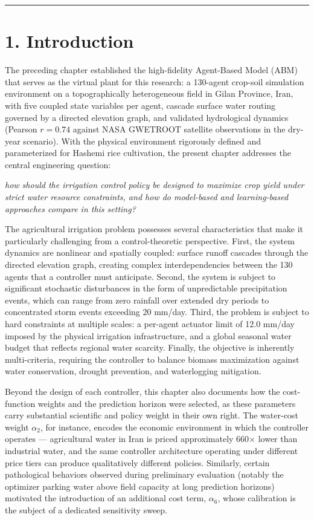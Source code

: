 \begin{center}\rule{0.5\linewidth}{0.5pt}\end{center}

\section{1. Introduction}\label{introduction}

The preceding chapter established the high-fidelity Agent-Based Model
(ABM) that serves as the virtual plant for this research: a 130-agent
crop-soil simulation environment on a topographically heterogeneous
field in Gilan Province, Iran, with five coupled state variables per
agent, cascade surface water routing governed by a directed elevation
graph, and validated hydrological dynamics (Pearson \(r = 0.74\) against
NASA GWETROOT satellite observations in the dry-year scenario). With the
physical environment rigorously defined and parameterized for Hashemi
rice cultivation, the present chapter addresses the central engineering
question:

\emph{how should the irrigation control policy be designed to maximize
crop yield under strict water resource constraints, and how do
model-based and learning-based approaches compare in this setting?}

The agricultural irrigation problem possesses several characteristics
that make it particularly challenging from a control-theoretic
perspective. First, the system dynamics are nonlinear and spatially
coupled: surface runoff cascades through the directed elevation graph,
creating complex interdependencies between the 130 agents that a
controller must anticipate. Second, the system is subject to significant
stochastic disturbances in the form of unpredictable precipitation
events, which can range from zero rainfall over extended dry periods to
concentrated storm events exceeding 20 mm/day. Third, the problem is
subject to hard constraints at multiple scales: a per-agent actuator
limit of 12.0 mm/day imposed by the physical irrigation infrastructure,
and a global seasonal water budget that reflects regional water
scarcity. Finally, the objective is inherently multi-criteria, requiring
the controller to balance biomass maximization against water
conservation, drought prevention, and waterlogging mitigation.

Beyond the design of each controller, this chapter also documents how
the cost-function weights and the prediction horizon were selected, as
these parameters carry substantial scientific and policy weight in their
own right. The water-cost weight \(\alpha_2\), for instance, encodes the
economic environment in which the controller operates --- agricultural
water in Iran is priced approximately 660× lower than industrial water,
and the same controller architecture operating under different price
tiers can produce qualitatively different policies. Similarly, certain
pathological behaviors observed during preliminary evaluation (notably
the optimizer parking water above field capacity at long prediction
horizons) motivated the introduction of an additional cost term,
\(\alpha_6\), whose calibration is the subject of a dedicated
sensitivity sweep.

